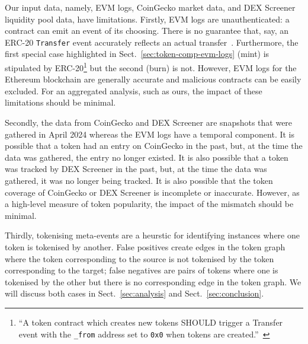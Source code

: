 Our input data, namely, EVM logs, CoinGecko market data, and DEX
Screener liquidity pool data, have limitations.  Firstly, EVM logs are
unauthenticated: a contract can emit an event of its choosing.  There
is no guarantee that, say, an ERC-20 \texttt{Transfer} event
accurately reflects an actual transfer~\cite{guidi-michienzi-22}.
Furthermore, the first special case highlighted in
Sect.~\ref{sec:token-comp-evm-logs} (mint) is stipulated by
ERC-20\footnote{``A token contract which creates new tokens SHOULD
trigger a Transfer event with the \texttt{\_from} address set to
\texttt{0x0} when tokens are
created.''~\cite{vogelsteller-buterin-15}} but the second (burn) is
not.  However, EVM logs for the Ethereum blockchain are generally
accurate and malicious contracts can be easily excluded.  For an
aggregated analysis, such as ours, the impact of these limitations
should be minimal.

Secondly, the data from CoinGecko and DEX Screener are snapshots that
were gathered in April 2024 whereas the EVM logs have a temporal
component.  It is possible that a token had an entry on CoinGecko in
the past, but, at the time the data was gathered, the entry no longer
existed.  It is also possible that a token was tracked by DEX Screener
in the past, but, at the time the data was gathered, it was no longer
being tracked.  It is also possible that the token coverage of
CoinGecko or DEX Screener is incomplete or inaccurate.  However, as a
high-level measure of token popularity, the impact of the mismatch
should be minimal.

Thirdly, tokenising meta-events are a heurstic for identifying
instances where one token is tokenised by another.  False positives
create edges in the token graph where the token corresponding to the
source is not tokenised by the token corresponding to the target;
false negatives are pairs of tokens where one is tokenised by the
other but there is no corresponding edge in the token graph.  We will
discuss both cases in Sect.~\ref{sec:analysis} and
Sect.~\ref{sec:conclusion}.
